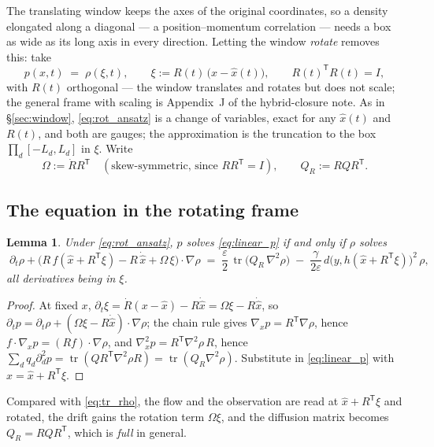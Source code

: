\documentclass[11pt,a4paper]{article}
\newcommand{\tr}{\operatorname{tr}}
\newcommand{\T}{^{\mathsf T}}
\newcommand{\xh}{\hat{x}}
\newcommand{\eps}{\varepsilon}
\newcommand{\grad}{\nabla}
\theoremstyle{plain}
\newtheorem{lemma}{Lemma}
\theoremstyle{definition}
\theoremstyle{remark}
\begin{document}
The translating window keeps the axes of the original coordinates, so a density elongated along a diagonal --- a position--momentum correlation --- needs a box as wide as its long axis in every direction. Letting the window \emph{rotate} removes this: take
\begin{equation}
  p(x,t) \;=\; \rho(\xi,t), \qquad \xi := R(t)\,\big(x-\xh(t)\big), \qquad R(t)\T R(t)=I,
  \label{eq:rot_ansatz}
\end{equation}
with $R(t)$ orthogonal --- the window translates and rotates but does not scale; the general frame with scaling is Appendix~J of the hybrid-closure note. As in \S\ref{sec:window}, \eqref{eq:rot_ansatz} is a change of variables, exact for any $\xh(t)$ and $R(t)$, and both are gauges; the approximation is the truncation to the box $\prod_d[-L_d,L_d]$ in $\xi$. Write
\begin{equation}
  \Omega := \dot RR\T \quad(\text{skew-symmetric, since } RR\T=I), \qquad Q_R := RQR\T .
  \label{eq:rot_omega}
\end{equation}

\subsection{The equation in the rotating frame}

\begin{lemma}
Under \eqref{eq:rot_ansatz}, $p$ solves \eqref{eq:linear_p} if and only if $\rho$ solves
\begin{equation}
  \boxed{\;
  \partial_t\rho + \big(R\,f(\xh+R\T\xi) - R\,\dot{\xh} + \Omega\,\xi\big)\cdot\grad\rho
  \;=\; \frac\eps2\,\tr\big(Q_R\,\grad^2\rho\big) \;-\; \frac{\gamma}{2\eps}\,d\big(y,h(\xh+R\T\xi)\big)^2\,\rho ,\;}
  \label{eq:rot_rho}
\end{equation}
all derivatives being in $\xi$.
\end{lemma}
\begin{proof}
At fixed $x$, $\partial_t\xi = \dot R(x-\xh) - R\dot{\xh} = \Omega\xi - R\dot{\xh}$, so $\partial_tp = \partial_t\rho + (\Omega\xi - R\dot{\xh})\cdot\grad\rho$; the chain rule gives $\grad_xp = R\T\grad\rho$, hence $f\cdot\grad_xp = (Rf)\cdot\grad\rho$, and $\grad_x^2p = R\T\grad^2\rho\,R$, hence $\sum_dq_d\partial_d^2p = \tr(QR\T\grad^2\rho R) = \tr(Q_R\grad^2\rho)$. Substitute in \eqref{eq:linear_p} with $x=\xh+R\T\xi$.
\end{proof}

Compared with \eqref{eq:tr_rho}, the flow and the observation are read at $\xh+R\T\xi$ and rotated, the drift gains the rotation term $\Omega\xi$, and the diffusion matrix becomes $Q_R=RQR\T$, which is \emph{full} in general.
\end{document}
